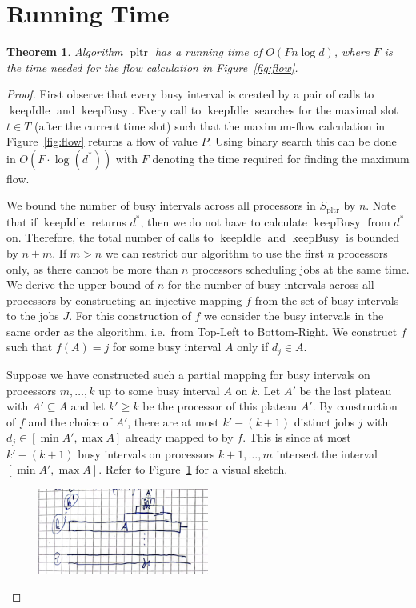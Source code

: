 \documentclass[a4paper]{article}
\DeclareMathOperator{\pltr}{pltr}
\DeclareMathOperator{\keepidle}{keepIdle}
\DeclareMathOperator{\keepbusy}{keepBusy}
\newtheorem{theorem}{Theorem}
\begin{document}
\section{Running Time}
\begin{theorem}
  Algorithm $\pltr$ has a running time of $O(F n \log d)$, where $F$ is the time needed for the flow calculation in Figure~\ref{fig:flow}.
\end{theorem}
\begin{proof}
  First observe that every busy interval is created by a pair of calls to $\keepidle$ and $\keepbusy$.
  Every call to $\keepidle$ searches for the maximal slot $t \in T$ (after the current time slot) such that the maximum-flow calculation in Figure~\ref{fig:flow} returns a flow of value $P$.
  Using binary search this can be done in $O(F \cdot \log(d^*))$ with $F$ denoting the time required for finding the maximum flow.

  We bound the number of busy intervals across all processors in $S_{\pltr}$ by $n$.
  Note that if $\keepidle$ returns $d^*$, then we do not have to calculate $\keepbusy$ from $d^*$ on.
  Therefore, the total number of calls to $\keepidle$ and $\keepbusy$ is bounded by $n + m$.
  If $m > n$ we can restrict our algorithm to use the first $n$ processors only, as there cannot be more than $n$ processors scheduling jobs at the same time.
  We derive the upper bound of $n$ for the number of busy intervals across all processors by constructing an injective mapping $f$ from the set of busy intervals to the jobs $J$.
  For this construction of $f$ we consider the busy intervals in the same order as the algorithm, i.e.\ from Top-Left to Bottom-Right.
  We construct $f$ such that $f(A) = j$ for some busy interval $A$ only if $d_j \in A$.

  Suppose we have constructed such a partial mapping for busy intervals on processors $m, \ldots, k$ up to some busy interval $A$ on $k$.
  Let $A'$ be the last plateau with $A' \subseteq A$ and let $k' \geq k$ be the processor of this plateau $A'$.
  By construction of $f$ and the choice of $A'$, there are at most $k' - (k + 1)$ distinct jobs $j$ with $d_j \in [\min A', \max A]$ already mapped to by $f$.
  This is since at most $k' - (k+1)$ busy intervals on processors $k+1, \ldots, m$ intersect the interval $[\min A', \max A]$.
  Refer to Figure~\ref{fig:running_time} for a visual sketch.

  \begin{figure}[H]
    \centering
    \includegraphics[width=0.5\textwidth]{graphics/sketches/running_time.png}\label{fig:running_time}
    \caption{}
  \end{figure}


\end{proof}
\end{document}

